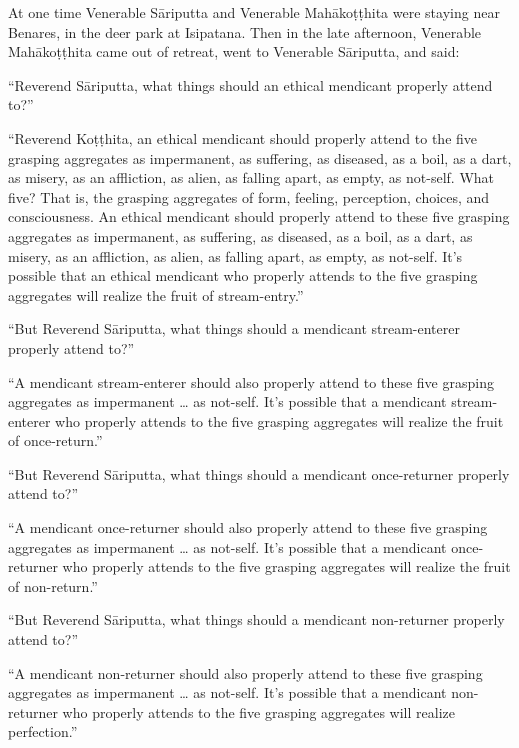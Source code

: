\documentclass[12pt,openany]{book}%
\begin{document}
At one time Venerable \textsanskrit{Sāriputta} and Venerable \textsanskrit{Mahākoṭṭhita} were staying near Benares, in the deer park at Isipatana. Then in the late afternoon, Venerable \textsanskrit{Mahākoṭṭhita} came out of retreat, went to Venerable \textsanskrit{Sāriputta}, and said: 

“Reverend \textsanskrit{Sāriputta}, what things should an ethical mendicant properly attend to?” 

“Reverend \textsanskrit{Koṭṭhita}, an ethical mendicant should properly attend to the five grasping aggregates as impermanent, as suffering, as diseased, as a boil, as a dart, as misery, as an affliction, as alien, as falling apart, as empty, as not-self. What five? That is, the grasping aggregates of form, feeling, perception, choices, and consciousness. An ethical mendicant should properly attend to these five grasping aggregates as impermanent, as suffering, as diseased, as a boil, as a dart, as misery, as an affliction, as alien, as falling apart, as empty, as not-self. It’s possible that an ethical mendicant who properly attends to the five grasping aggregates will realize the fruit of stream-entry.” 

“But Reverend \textsanskrit{Sāriputta}, what things should a mendicant stream-enterer properly attend to?” 

“A mendicant stream-enterer should also properly attend to these five grasping aggregates as impermanent … as not-self. It’s possible that a mendicant stream-enterer who properly attends to the five grasping aggregates will realize the fruit of once-return.” 

“But Reverend \textsanskrit{Sāriputta}, what things should a mendicant once-returner properly attend to?” 

“A mendicant once-returner should also properly attend to these five grasping aggregates as impermanent … as not-self. It’s possible that a mendicant once-returner who properly attends to the five grasping aggregates will realize the fruit of non-return.” 

“But Reverend \textsanskrit{Sāriputta}, what things should a mendicant non-returner properly attend to?” 

“A mendicant non-returner should also properly attend to these five grasping aggregates as impermanent … as not-self. It’s possible that a mendicant non-returner who properly attends to the five grasping aggregates will realize perfection.” 
\end{document}
